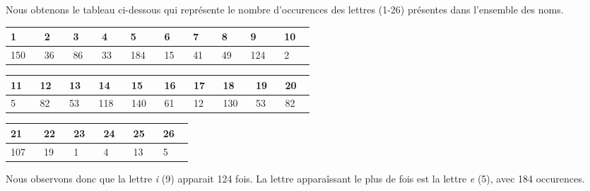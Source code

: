 \documentclass[a4paper,12pt]{report}
\begin{document}
Nous obtenons le tableau ci-dessous qui représente le nombre d'occurences des lettres (1-26) présentes dans l'ensemble des noms.
\begin{center}
\begin{longtable}[c]{|p{0.05\linewidth}|p{0.05\linewidth}|p{0.05\linewidth}|p{0.05\linewidth}|p{0.05\linewidth}|p{0.05\linewidth}|p{0.05\linewidth}|p{0.05\linewidth}|p{0.05\linewidth}|p{0.05\linewidth}} 
   \hline
   \cellcolor{gray!40}\textbf{1} &
   \cellcolor{gray!40}\textbf{2} &
   \cellcolor{gray!40}\textbf{3} &
   \cellcolor{gray!40}\textbf{4} &
   \cellcolor{gray!40}\textbf{5} &
   \cellcolor{gray!40}\textbf{6} &
   \cellcolor{gray!40}\textbf{7} &
   \cellcolor{gray!40}\textbf{8} &
   \cellcolor{gray!40}\textbf{9} &
   \cellcolor{gray!40}\textbf{10} \\ \hline
   150 &
   36 &
   86 &
   33 &
   184 &
   15 &
   41 &
   49 &
   124 &
   2 \\ \hline
\end{longtable}
\begin{longtable}[c]{|p{0.05\linewidth}|p{0.05\linewidth}|p{0.05\linewidth}|p{0.05\linewidth}|p{0.05\linewidth}|p{0.05\linewidth}|p{0.05\linewidth}|p{0.05\linewidth}|p{0.05\linewidth}|p{0.05\linewidth}} 
   \hline
   \cellcolor{gray!40}\textbf{11} &
   \cellcolor{gray!40}\textbf{12} &
   \cellcolor{gray!40}\textbf{13} &
   \cellcolor{gray!40}\textbf{14} &
   \cellcolor{gray!40}\textbf{15} &
   \cellcolor{gray!40}\textbf{16} &
   \cellcolor{gray!40}\textbf{17} &
   \cellcolor{gray!40}\textbf{18} &
   \cellcolor{gray!40}\textbf{19} &
   \cellcolor{gray!40}\textbf{20} \\ \hline
   5 &
   82 &
   53 &
   118 &
   140 &
   61 &
   12 &
   130 &
   53 &
   82 \\ \hline
\end{longtable}
\begin{longtable}[c]{|p{0.05\linewidth}|p{0.05\linewidth}|p{0.05\linewidth}|p{0.05\linewidth}|p{0.05\linewidth}|p{0.05\linewidth}} 
   \hline
   \cellcolor{gray!40}\textbf{21} &
   \cellcolor{gray!40}\textbf{22} &
   \cellcolor{gray!40}\textbf{23} &
   \cellcolor{gray!40}\textbf{24} &
   \cellcolor{gray!40}\textbf{25} &
   \cellcolor{gray!40}\textbf{26} \\ \hline
   107 &
   19 &
   1 &
   4 &
   13 &
   5 \\ \hline
\end{longtable}
\end{center}

Nous observons donc que la lettre \textit{i} (9) apparait 124 fois. La lettre apparaîssant le plus de fois est la lettre \textit{e} (5), avec 184 occurences.
\end{document}
